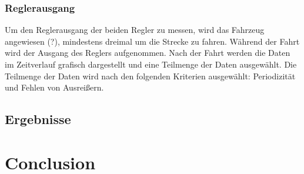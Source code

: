 \documentclass[arbeit=studie,oneside,BCOR=12mm]{ArbeitRST}
\begin{document}
\subsection{Reglerausgang}

Um den Reglerausgang der beiden Regler zu messen, wird das Fahrzeug angewiesen
(?), mindestens dreimal um die Strecke zu fahren. Während der Fahrt wird der
Ausgang des Reglers aufgenommen. Nach der Fahrt werden die Daten im Zeitverlauf
grafisch dargestellt und eine Teilmenge der Daten ausgewählt. Die Teilmenge der
Daten wird nach den folgenden Kriterien ausgewählt: Periodizität und Fehlen von
Ausreißern.

\section{Ergebnisse}



\chapter{Conclusion}
\end{document}
